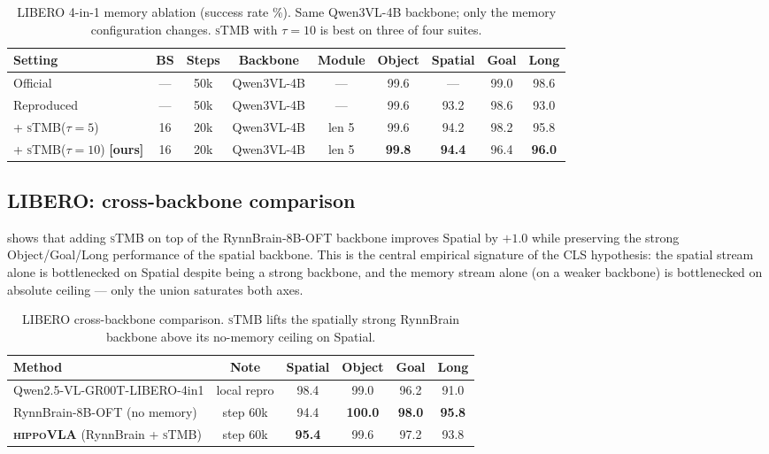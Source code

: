 \documentclass[10pt,letterpaper]{article}
\newcommand{\method}{\textsc{hippoVLA}\xspace}
\newcommand{\sTMB}{\textsc{sTMB}\xspace}
\begin{document}
\begin{table}[t]
\centering
\small
\caption{LIBERO 4-in-1 memory ablation (success rate \%). Same Qwen3VL-4B backbone; only the memory configuration changes. \sTMB with $\tau=10$ is best on three of four suites.}
\label{tab:libero-mem}
\begin{tabular}{lcccccccc}
\toprule
Setting & BS & Steps & Backbone & Module & Object & Spatial & Goal & Long \\
\midrule
Official        & --- & 50k & Qwen3VL-4B & ---       & 99.6 & ---  & 99.0 & 98.6 \\
Reproduced      & --- & 50k & Qwen3VL-4B & ---       & 99.6 & 93.2 & 98.6 & 93.0 \\
+ \sTMB ($\tau{=}5$)  & 16  & 20k & Qwen3VL-4B & len 5 & 99.6 & 94.2 & 98.2 & 95.8 \\
+ \sTMB ($\tau{=}10$) \textbf{[ours]} & 16 & 20k & Qwen3VL-4B & len 5 & \textbf{99.8} & \textbf{94.4} & 96.4 & \textbf{96.0} \\
\bottomrule
\end{tabular}
\end{table}

\subsection{LIBERO: cross-backbone comparison}
\label{sec:exp-libero-cross}
 shows that adding \sTMB on top of the RynnBrain-8B-OFT backbone improves Spatial by $+1.0$ while preserving the strong Object/Goal/Long performance of the spatial backbone. This is the central empirical signature of the CLS hypothesis: the spatial stream alone is bottlenecked on Spatial despite being a strong backbone, and the memory stream alone (on a weaker backbone) is bottlenecked on absolute ceiling --- only the union saturates both axes.

\begin{table}[t]
\centering
\small
\caption{LIBERO cross-backbone comparison. \sTMB lifts the spatially strong RynnBrain backbone above its no-memory ceiling on Spatial.}
\label{tab:libero-cross}
\begin{tabular}{lccccc}
\toprule
Method & Note & Spatial & Object & Goal & Long \\
\midrule
Qwen2.5-VL-GR00T-LIBERO-4in1            & local repro      & 98.4 & 99.0 & 96.2 & 91.0 \\
RynnBrain-8B-OFT (no memory)            & step 60k         & 94.4 & \textbf{100.0} & \textbf{98.0} & \textbf{95.8} \\
\textbf{\method} (RynnBrain + \sTMB)    & step 60k         & \textbf{95.4} & 99.6 & 97.2 & 93.8 \\
\bottomrule
\end{tabular}
\end{table}
\end{document}
